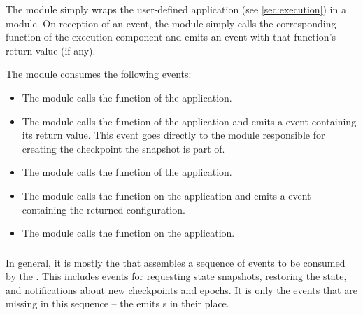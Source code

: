 \documentclass{article}
\begin{document}
The  module simply wraps the user-defined application (see \cref{sec:execution}) in a module.
On reception of an event, the  module simply calls the corresponding function of the execution component
and emits an event with that function's return value (if any).

The  module consumes the following events:

\begin{itemize}

    \item {}
    The  module calls the  function of the application.

    \item {}
    The  module calls the  function of the application
    and emits a  event containing its return value.
    This  event goes directly to the  module responsible for creating the checkpoint the snapshot is part of.

    \item {}
    The  module calls the  function of the application.

    \item {}
    The  module calls the  function on the application
    and emits a  event containing the returned configuration.

    \item {}
    The  module calls the  function on the application.

\end{itemize}

\subsubsection{}

In general, it is mostly the  that assembles a sequence of events to be consumed by the .
This includes events for requesting state snapshots, restoring the state, and notifications about new checkpoints and epochs.
It is only the  events that are missing in this sequence -- the  emits s in their place.
\end{document}
